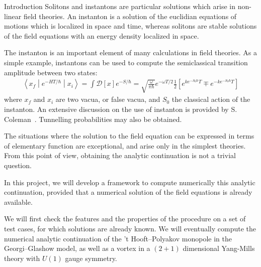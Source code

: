 \begin{section}{Introduction}
  Solitons and instantons are particular solutions which arise in
  non-linear field theories. An instanton is a solution of the
  euclidian equations of motions which is localized in space
  and time, whereas solitons are stable solutions of the field
  equations with an energy density localized in space.

  The instanton is an important element of many calculations in field
  theories. As a simple example, instantons can be used to compute the
  semiclassical transition amplitude between two states:
  \begin{align*}
    \left\langle x_f\middle|e^{-HT/\hbar}\middle|x_i\right\rangle = \int \mathcal D[x]e^{-S/\hbar} = \sqrt{\frac{\omega}{\pi\hbar}}e^{-\omega T/2}\frac{1}{2}\left[e^{ke^{-S_0\hbar}T}\mp e^{-ke^{-S_0\hbar}T}\right]
  \end{align*}
  where $x_f$ and $x_i$ are two vacua, or false vacua, and $S_0$ the
  classical action of the instanton. An extensive discussion on the
  use of instanton is provided by S. Coleman~\cite{col}. Tunnelling
  probabilities may also be obtained.

  The situations where the solution to the field equation can be
  expressed in terms of elementary function are exceptional, and arise
  only in the simplest theories. From this point of view, obtaining
  the analytic continuation is not a trivial question.

  In this project, we will develop a framework to compute numerically
  this analytic continuation, provided that a numerical solution of
  the field equations is already available.

  We will first check the features and the properties of the procedure
  on a set of test cases, for which solutions are already known. We will
  eventually compute the numerical analytic continuation of the 't
  Hooft--Polyakov monopole in the Georgi--Glashow model, as well as a
  vortex in a $(2+1)$ dimensional Yang-Mills theory with $U(1)$ gauge
  symmetry.



\end{section}
